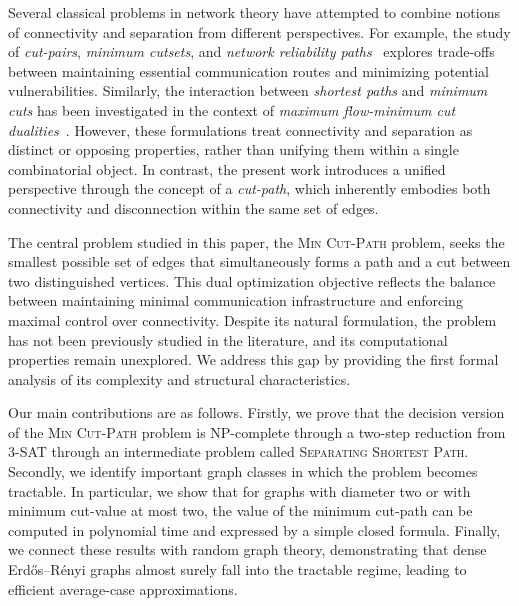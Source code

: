 \documentclass[journal ]{new-aiaa}
\numberwithin{equation}{section}
\theoremstyle{definition}
\theoremstyle{plain}
\theoremstyle{remark}
\begin{document}
Several classical problems in network theory have attempted to combine notions of connectivity and separation from different perspectives. 
For example, the study of \emph{cut-pairs}, \emph{minimum cutsets}, and \emph{network reliability paths}~\cite{GomoryHu1961,NagamochiKameda1996,Mehlhorn2016Certifying} explores trade-offs between maintaining essential communication routes and minimizing potential vulnerabilities. 
Similarly, the interaction between \emph{shortest paths} and \emph{minimum cuts} has been investigated in the context of \emph{maximum flow-minimum cut dualities}~\cite{Cormen2022}. 
However, these formulations treat connectivity and separation as distinct or opposing properties, rather than unifying them within a single combinatorial object. 
In contrast, the present work introduces a unified perspective through the concept of a \emph{cut-path}, which inherently embodies both connectivity and disconnection within the same set of edges.


The central problem studied in this paper, the \textsc{Min Cut-Path} problem, seeks the smallest possible set of edges that simultaneously forms a path and a cut between two distinguished vertices. 
This dual optimization objective reflects the balance between maintaining minimal communication infrastructure and enforcing maximal control over connectivity. 
Despite its natural formulation, the problem has not been previously studied in the literature, and its computational properties remain unexplored. 
We address this gap by providing the first formal analysis of its complexity and structural characteristics.

Our main contributions are as follows. 
Firstly, we prove that the decision version of the \textsc{Min Cut-Path} problem is NP-complete through a two-step reduction from 3-SAT through an intermediate problem called \textsc{Separating Shortest Path}. 
Secondly, we identify important graph classes in which the problem becomes tractable. 
In particular, we show that for graphs with diameter two or with minimum cut-value at most two, the value of the minimum cut-path can be computed in polynomial time and expressed by a simple closed formula. 
Finally, we connect these results with random graph theory, demonstrating that dense Erdős–Rényi graphs almost surely fall into the tractable regime, leading to efficient average-case approximations.
\end{document}
